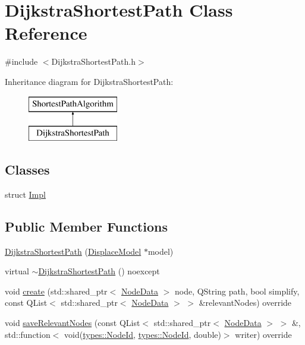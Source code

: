 \hypertarget{class_dijkstra_shortest_path}{}\section{Dijkstra\+Shortest\+Path Class Reference}
\label{class_dijkstra_shortest_path}


{\ttfamily \#include $<$Dijkstra\+Shortest\+Path.\+h$>$}

Inheritance diagram for Dijkstra\+Shortest\+Path\+:\begin{figure}[H]
\begin{center}
\leavevmode
\includegraphics[height=2.000000cm]{dc/d9a/class_dijkstra_shortest_path}
\end{center}
\end{figure}
\subsection*{Classes}
\begin{DoxyCompactItemize}
\item 
struct \mbox{\hyperlink{struct_dijkstra_shortest_path_1_1_impl}{Impl}}
\end{DoxyCompactItemize}
\subsection*{Public Member Functions}
\begin{DoxyCompactItemize}
\item 
\mbox{\hyperlink{class_dijkstra_shortest_path_a551494d3df76cd6c0d54a56d98c7f65b}{Dijkstra\+Shortest\+Path}} (\mbox{\hyperlink{class_displace_model}{Displace\+Model}} $\ast$model)
\item 
virtual \mbox{\hyperlink{class_dijkstra_shortest_path_a30c2590f2a9e572a9080fc1ed4b81b0d}{$\sim$\+Dijkstra\+Shortest\+Path}} () noexcept
\item 
void \mbox{\hyperlink{class_dijkstra_shortest_path_a4b3a7a806a0da2b4ddc4fc5a1f769f24}{create}} (std\+::shared\+\_\+ptr$<$ \mbox{\hyperlink{class_node_data}{Node\+Data}} $>$ node, Q\+String path, bool simplify, const Q\+List$<$ std\+::shared\+\_\+ptr$<$ \mbox{\hyperlink{class_node_data}{Node\+Data}} $>$ $>$ \&relevant\+Nodes) override
\item 
void \mbox{\hyperlink{class_dijkstra_shortest_path_a9520d7dadce62855b5bbf6d4711f9d3f}{save\+Relevant\+Nodes}} (const Q\+List$<$ std\+::shared\+\_\+ptr$<$ \mbox{\hyperlink{class_node_data}{Node\+Data}} $>$ $>$ \&, std\+::function$<$ void(\mbox{\hyperlink{classtypes_1_1_node_id}{types\+::\+Node\+Id}}, \mbox{\hyperlink{classtypes_1_1_node_id}{types\+::\+Node\+Id}}, double)$>$ writer) override
\end{DoxyCompactItemize}


